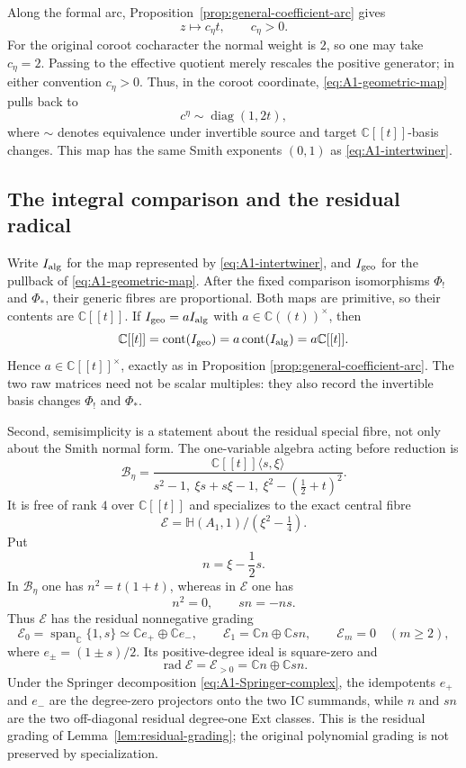 \documentclass[11pt]{amsart}
\theoremstyle{definition}
\theoremstyle{remark}
\newcommand{\Hh}{\mathbb H}
\newcommand{\C}{\mathbb C}
\newcommand{\A}{\C[[t]]}
\newcommand{\K}{\C((t))}
\begin{document}
Along the formal arc, Proposition~\ref{prop:general-coefficient-arc} gives
\[
 z\longmapsto c_\eta t,
 \qquad c_\eta>0.
\]
For the original coroot cocharacter the normal weight is $2$, so one may
take $c_\eta=2$.  Passing to the effective quotient merely rescales the
positive generator; in either convention $c_\eta>0$.  Thus, in the coroot
coordinate, \eqref{eq:A1-geometric-map} pulls back to
\[
 c^\eta\sim\operatorname{diag}(1,2t),
\]
where $\sim$ denotes equivalence under invertible source and target
$\A$-basis changes.  This map has the same Smith exponents $(0,1)$ as
\eqref{eq:A1-intertwiner}.

\subsection{The integral comparison and the residual radical}

Write $I_{\rm alg}$ for the map represented by
\eqref{eq:A1-intertwiner}, and $I_{\rm geo}$ for the pullback of
\eqref{eq:A1-geometric-map}.  After the fixed comparison isomorphisms
$\Phi_!$ and $\Phi_*$, their generic fibres are proportional.  Both maps
are primitive, so their contents are $\A$.  If
$I_{\rm geo}=aI_{\rm alg}$ with $a\in\K^\times$, then
\[
 \A=\operatorname{cont}(I_{\rm geo})
 =a\operatorname{cont}(I_{\rm alg})=a\A.
\]
Hence $a\in\A^\times$, exactly as in Proposition
\ref{prop:general-coefficient-arc}.  The two raw matrices need not be scalar
multiples: they also record the invertible basis changes $\Phi_!$ and
$\Phi_*$.

Second, semisimplicity is a statement about the residual special fibre, not
only about the Smith normal form.  The one-variable algebra acting before
reduction is
\[
 \mathcal B_\eta=
 \frac{\A\langle s,\xi\rangle}
 {s^2-1,\ \xi s+s\xi-1,\
  \xi^2-(\frac12+t)^2}.
\]
It is free of rank $4$ over $\A$ and specializes to the exact central fibre
\[
 \mathcal E=
 \Hh(A_1,1)/(\xi^2-\tfrac14).
\]
Put
\[
 n=\xi-\frac12s.
\]
In $\mathcal B_\eta$ one has $n^2=t(1+t)$, whereas in $\mathcal E$ one has
\[
 n^2=0,\qquad sn=-ns.
\]
Thus $\mathcal E$ has the residual nonnegative grading
\[
 \mathcal E_0=\operatorname{span}_{\mathbb C}\{1,s\}
   \simeq\mathbb Ce_+\oplus\mathbb Ce_-,
 \qquad
 \mathcal E_1=\mathbb Cn\oplus\mathbb Csn,
 \qquad \mathcal E_m=0\quad(m\geq2),
\]
where $e_\pm=(1\pm s)/2$.  Its positive-degree ideal is square-zero and
\begin{equation}\label{eq:A1-radical}
 \operatorname{rad}\mathcal E
 =\mathcal E_{>0}=\mathbb Cn\oplus\mathbb Csn.
\end{equation}
Under the Springer decomposition \eqref{eq:A1-Springer-complex}, the
idempotents $e_+$ and $e_-$ are the degree-zero projectors onto the two IC
summands, while $n$ and $sn$ are the two off-diagonal residual degree-one
Ext classes.  This is the residual grading of
Lemma~\ref{lem:residual-grading}; the original polynomial grading is not
preserved by specialization.
\end{document}
